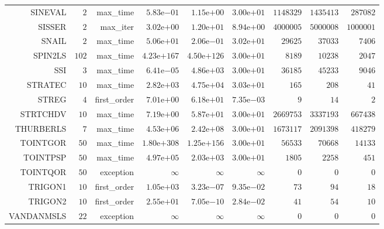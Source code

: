 \begin{longtable}{rrrrrrrrr}
SINEVAL & \(     2\) & max\_time & \( 5.83\)e\(-01\) & \( 1.15\)e\(+00\) & \( 3.00\)e\(+01\) & \(1148329\) & \(1435413\) & \(287082\) \\
SISSER & \(     2\) & max\_iter & \( 3.02\)e\(+00\) & \( 1.20\)e\(+01\) & \( 8.94\)e\(+00\) & \(4000005\) & \(5000008\) & \(1000001\) \\
SNAIL & \(     2\) & max\_time & \( 5.06\)e\(+01\) & \( 2.06\)e\(-01\) & \( 3.02\)e\(+01\) & \( 29625\) & \( 37033\) & \(  7406\) \\
SPIN2LS & \(   102\) & max\_time & \(4.23\)e\(+167\) & \(4.50\)e\(+126\) & \( 3.00\)e\(+01\) & \(  8189\) & \( 10238\) & \(  2047\) \\
SSI & \(     3\) & max\_time & \( 6.41\)e\(-05\) & \( 4.86\)e\(+03\) & \( 3.00\)e\(+01\) & \( 36185\) & \( 45233\) & \(  9046\) \\
STRATEC & \(    10\) & max\_time & \( 2.82\)e\(+03\) & \( 4.75\)e\(+04\) & \( 3.03\)e\(+01\) & \(   165\) & \(   208\) & \(    41\) \\
STREG & \(     4\) & first\_order & \( 7.01\)e\(+00\) & \( 6.18\)e\(+01\) & \( 7.35\)e\(-03\) & \(     9\) & \(    14\) & \(     2\) \\
STRTCHDV & \(    10\) & max\_time & \( 7.19\)e\(+00\) & \( 5.87\)e\(+01\) & \( 3.00\)e\(+01\) & \(2669753\) & \(3337193\) & \(667438\) \\
THURBERLS & \(     7\) & max\_time & \( 4.53\)e\(+06\) & \( 2.42\)e\(+08\) & \( 3.00\)e\(+01\) & \(1673117\) & \(2091398\) & \(418279\) \\
TOINTGOR & \(    50\) & max\_time & \(1.80\)e\(+308\) & \(1.25\)e\(+156\) & \( 3.00\)e\(+01\) & \( 56533\) & \( 70668\) & \( 14133\) \\
TOINTPSP & \(    50\) & max\_time & \( 4.97\)e\(+05\) & \( 2.03\)e\(+03\) & \( 3.00\)e\(+01\) & \(  1805\) & \(  2258\) & \(   451\) \\
TOINTQOR & \(    50\) & exception & \(\infty\) & \(\infty\) & \(\infty\) & \(     0\) & \(     0\) & \(     0\) \\
TRIGON1 & \(    10\) & first\_order & \( 1.05\)e\(+03\) & \( 3.23\)e\(-07\) & \( 9.35\)e\(-02\) & \(    73\) & \(    94\) & \(    18\) \\
TRIGON2 & \(    10\) & first\_order & \( 2.55\)e\(+01\) & \( 7.05\)e\(-10\) & \( 2.84\)e\(-02\) & \(    41\) & \(    54\) & \(    10\) \\
VANDANMSLS & \(    22\) & exception & \(\infty\) & \(\infty\) & \(\infty\) & \(     0\) & \(     0\) & \(     0\) \\

\end{longtable}
